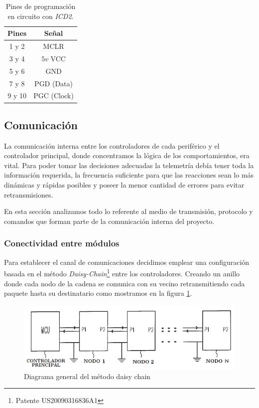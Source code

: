 \begin{table}
	\begin{center}
		\begin{tabular}{|c|c|}
			\hline
			Pines & Se\~nal \\
			\hline
			1 y 2 & MCLR \\
			\hline
			3 y 4 & $5v$ VCC \\
			\hline
			5 y 6 & GND \\
			\hline
			7 y 8 & PGD (Data) \\
			\hline
			9 y 10 & PGC (Clock) \\
			\hline
		\end{tabular}
		\caption{Pines de programaci\'on en circuito con \emph{ICD2}.}
		\label{hT_header_icd2}
	\end{center}
\end{table}


\subsection{Comunicaci\'on}
\label{h_comm}

La comunicaci\'on interna entre los controladores de cada perif\'erico y el controlador principal, donde concentramos
la l\'ogica de los comportamientos, era vital.
Para poder tomar las decisiones adecuadas la telemetr\'ia deb\'ia tener toda la informaci\'on requerida, la frecuencia
suficiente para que las reacciones sean lo m\'as din\'amicas y r\'apidas posibles y poseer la menor cantidad de errores
para evitar retransmisiones.

En esta secci\'on analizamos todo lo referente al medio de transmisi\'on, protocolo y comandos que forman parte de la
comunicaci\'on interna del proyecto.

\subsubsection{Conectividad entre m\'odulos}
\label{h_comm_conectividad}

Para establecer el canal de comunicaciones decidimos emplear una configuraci\'on basada en el m\'etodo
\emph{Daisy-Chain}\footnote{Patente US20090316836A1} entre los controladores.
Creando un anillo donde cada nodo de la cadena se comunica con su vecino retransmitiendo cada paquete
hasta su destinatario como mostramos en la figura \ref{hF_comm_daisychain}.

\begin{figure}[ht]
	\centering
	\includegraphics[scale=.40]{figuras/daisychain_diagram.png}
	\caption{Diagrama general del m\'etodo daisy chain}
	\label{hF_comm_daisychain}
\end{figure}

